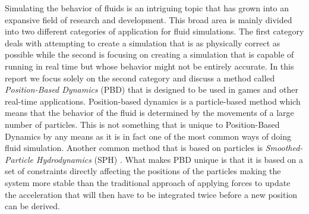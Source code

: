 Simulating the behavior of fluids is an intriguing topic that has grown into an
expansive field of research and development. This broad area is mainly divided
into two different categories of application for fluid simulations. The first
category deals with attempting to create a simulation that is as physically
correct as possible while the second is focusing on creating a simulation that
is capable of running in real time but whose behavior might not be entirely
accurate. In this report we focus solely on the second category and discuss a
method called \textit{Position-Based Dynamics} (PBD) \cite{muller2007position}
that is designed to be used in games and other real-time applications.
Position-based dynamics is a particle-based method which means that the
behavior of the fluid is determined by the movements of a large number of
particles. This is not something that is unique to Position-Based Dynamics by
any means as it is in fact one of the most common ways of doing fluid
simulation. Another common method that is based on particles is
\textit{Smoothed-Particle Hydrodynamics} (SPH) \cite{monaghan1992smoothed}.
What makes PBD unique is that it is based on a set of constraints directly
affecting the positions of the particles making the system more stable than the
traditional approach of applying forces to update the acceleration that will
then have to be integrated twice before a new position can be derived.
